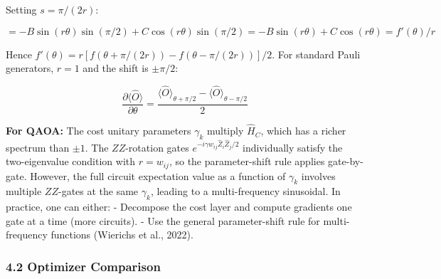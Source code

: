 \documentclass[
  11pt,
]{report}
\begin{document}
Setting \(s = \pi/(2r)\):

\[= -B\sin(r\theta)\sin(\pi/2) + C\cos(r\theta)\sin(\pi/2) = -B\sin(r\theta) + C\cos(r\theta) = f'(\theta)/r\]

Hence \(f'(\theta) = r[f(\theta + \pi/(2r)) - f(\theta - \pi/(2r))]/2\).
For standard Pauli generators, \(r = 1\) and the shift is \(\pm \pi/2\):

\[\frac{\partial \langle \hat{O} \rangle}{\partial \theta} = \frac{\langle \hat{O}\rangle_{\theta + \pi/2} - \langle \hat{O}\rangle_{\theta - \pi/2}}{2}\]

\textbf{For QAOA:} The cost unitary parameters \(\gamma_k\) multiply
\(\hat{H}_C\), which has a richer spectrum than \(\pm 1\). The
\(ZZ\)-rotation gates \(e^{-i\gamma w_{ij} \hat{Z}_i \hat{Z}_j/2}\)
individually satisfy the two-eigenvalue condition with \(r = w_{ij}\),
so the parameter-shift rule applies gate-by-gate. However, the full
circuit expectation value as a function of \(\gamma_k\) involves
multiple \(ZZ\)-gates at the same \(\gamma_k\), leading to a
multi-frequency sinusoidal. In practice, one can either: - Decompose the
cost layer and compute gradients one gate at a time (more circuits). -
Use the general parameter-shift rule for multi-frequency functions
(Wierichs et al., 2022).

\subsubsection{4.2 Optimizer Comparison}\label{optimizer-comparison}
\end{document}
